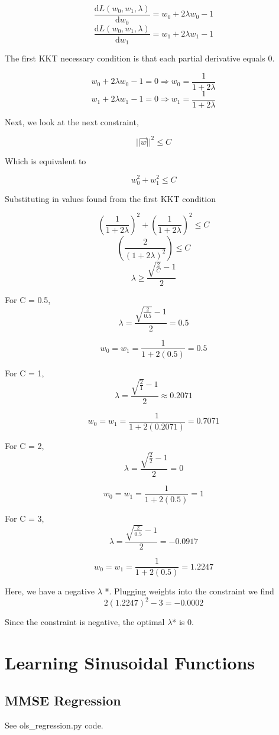 \documentclass{article}
\begin{document}
\[\frac{\mathrm{d}L(w_0, w_1, \lambda)}{\mathrm{d}w_0} = w_0 + 2\lambda w_0 - 1 \]
\[\frac{\mathrm{d}L(w_0, w_1, \lambda)}{\mathrm{d}w_1} = w_1 + 2\lambda w_1 - 1 \]

The first KKT necessary condition is that each partial derivative equals 0.

\[w_0 + 2\lambda w_0 - 1 = 0 \Rightarrow w_0 = \frac{1}{1+2\lambda}\]
\[w_1 + 2\lambda w_1 - 1 = 0 \Rightarrow w_1 = \frac{1}{1+2\lambda}\]

Next, we look at the next constraint,

\[||\Vec{w}||^2 \leq C\] 

Which is equivalent to 

\[w_0^2 + w_1^2 \leq C\] 

Substituting in values found from the first KKT condition

\[(\frac{1}{1+2\lambda})^2 + (\frac{1}{1+2\lambda})^2  \leq C\]
\[(\frac{2}{(1+2\lambda)^2}) \leq C\]
\[\lambda \ge \frac{\sqrt{\frac{2}{C}} - 1}{2}\]

For C = 0.5, 
\[\lambda = \frac{\sqrt{\frac{2}{0.5}} - 1}{2} = 0.5\]

\[w_0 = w_1 = \frac{1}{1+2(0.5)} = 0.5 \]

For C = 1, 
\[\lambda = \frac{\sqrt{\frac{2}{1}} - 1}{2} \approx 0.2071 \]

\[w_0 = w_1 = \frac{1}{1+2(0.2071)} = 0.7071 \]

For C = 2, 
\[\lambda = \frac{\sqrt{\frac{2}{2}} - 1}{2} = 0\]

\[w_0 = w_1 = \frac{1}{1+2(0.5)} = 1 \]

For C = 3, 
\[\lambda = \frac{\sqrt{\frac{2}{0.5}} - 1}{2} = -0.0917\]

\[w_0 = w_1 = \frac{1}{1+2(0.5)} = 1.2247 \]

Here, we have a negative $\lambda$ *. Plugging weights into the constraint we find
\[2(1.2247)^2 - 3 = -0.0002 \] 

Since the constraint is negative, the optimal $\lambda$* is 0.

\section{Learning Sinusoidal Functions}
\subsection{MMSE Regression}

See ols\_regression.py code.
\end{document}
